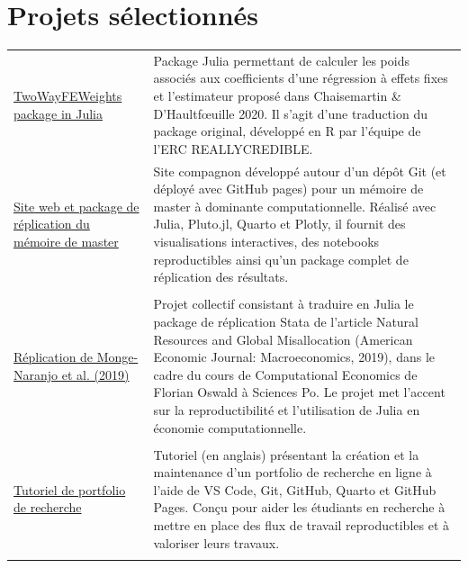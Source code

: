 \documentclass[a4paper,12pt]{article}
\begin{document}
\section{Projets sélectionnés}

\begin{tabularx}{\linewidth}{@{}l X@{}}

    \href{https://www.paulogcd.com/twowayfeweights.jl/dev/}{TwoWayFEWeights package in Julia} &
    Package Julia permettant de calculer les poids associés aux coefficients d'une régression à effets fixes et l'estimateur proposé dans Chaisemartin \& D'Haultfœuille 2020.
    Il s'agit d'une traduction du package original, développé en R par l'équipe de l'ERC REALLYCREDIBLE. \\

    \href{https://www.paulogcd.com/Master_Thesis}{Site web et package de réplication du mémoire de master} &
    Site compagnon développé autour d'un dépôt Git (et déployé avec GitHub pages) pour un mémoire de master à dominante computationnelle.
    Réalisé avec Julia, Pluto.jl, Quarto et Plotly, il fournit des visualisations interactives, des notebooks reproductibles ainsi qu'un package complet de réplication des résultats. \\ \\

    \href{https://www.paulogcd.com/Replication_Monge_et_al_2019.jl/dev/}{Réplication de Monge-Naranjo et al. (2019)} &
    Projet collectif consistant à traduire en Julia le package de réplication Stata de l'article Natural Resources and Global Misallocation (American Economic Journal: Macroeconomics, 2019), dans le cadre du cours de Computational Economics de Florian Oswald à Sciences Po.
    Le projet met l'accent sur la reproductibilité et l'utilisation de Julia en économie computationnelle. \\ \\

    \href{https://www.paulogcd.com/portfolio_tutorial/}{Tutoriel de portfolio de recherche} &
    Tutoriel (en anglais) présentant la création et la maintenance d'un portfolio de recherche en ligne à l'aide de VS Code, Git, GitHub, Quarto et GitHub Pages.
    Conçu pour aider les étudiants en recherche à mettre en place des flux de travail reproductibles et à valoriser leurs travaux. \\ \\

\end{tabularx}
\end{document}
